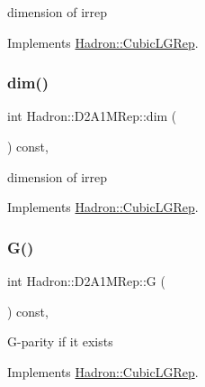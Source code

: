dimension of irrep 

Implements \mbox{\hyperlink{structHadron_1_1CubicLGRep_a3acbaea26503ed64f20df693a48e4cdd}{Hadron\+::\+Cubic\+L\+G\+Rep}}.

\mbox{\label{structHadron_1_1D2A1MRep_a2a6e259c17f5c9b6c35271b8b25ecfab}} 
\subsubsection{\texorpdfstring{dim()}{dim()}\hspace{0.1cm}{\footnotesize\ttfamily [2/2]}}
{\footnotesize\ttfamily int Hadron\+::\+D2\+A1\+M\+Rep\+::dim (\begin{DoxyParamCaption}{ }\end{DoxyParamCaption}) const\hspace{0.3cm}{\ttfamily [inline]}, {\ttfamily [virtual]}}

dimension of irrep 

Implements \mbox{\hyperlink{structHadron_1_1CubicLGRep_a3acbaea26503ed64f20df693a48e4cdd}{Hadron\+::\+Cubic\+L\+G\+Rep}}.

\mbox{\label{structHadron_1_1D2A1MRep_a0778e49dc6d5a6cfa12f824a75b23b4b}} 
\subsubsection{\texorpdfstring{G()}{G()}\hspace{0.1cm}{\footnotesize\ttfamily [1/2]}}
{\footnotesize\ttfamily int Hadron\+::\+D2\+A1\+M\+Rep\+::G (\begin{DoxyParamCaption}{ }\end{DoxyParamCaption}) const\hspace{0.3cm}{\ttfamily [inline]}, {\ttfamily [virtual]}}

G-\/parity if it exists 

Implements \mbox{\hyperlink{structHadron_1_1CubicLGRep_ace26f7b2d55e3a668a14cb9026da5231}{Hadron\+::\+Cubic\+L\+G\+Rep}}.

\mbox{\label{structHadron_1_1D2A1MRep_a0778e49dc6d5a6cfa12f824a75b23b4b}} 
